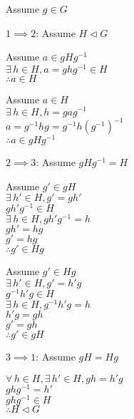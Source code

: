 \documentclass[letterpaper,12pt,fleqn]{article}
\newcommand{\n}{\mathrel{\triangleleft}}
\begin{document}
\begin{theproof}
  Assume $g\in G$
  
  \begin{description}
  \item{$1\implies2$}: Assume $H\n G$

    \begin{minipage}[t]{3in}
      Assume $a\in gHg^{-1}$ \\
      $\exists\,h\in H,a=ghg^{-1}\in H$ \\
      $\therefore a\in H$
    \end{minipage}
    \begin{minipage}[t]{3in}
      Assume $a\in H$ \\
      $\exists\,h\in H,h=gag^{-1}$ \\
      $a=g^{-1}hg=g^{-1}h(g^{-1})^{-1}$ \\
      $\therefore a\in gHg^{-1}$
    \end{minipage}

  \item{$2\implies3$}: Assume $gHg^{-1}=H$

    \begin{minipage}[t]{3in}
      Assume $g'\in gH$ \\
      $\exists\,h'\in H,g'=gh'$ \\
      $gh'g^{-1}\in H$ \\
      $\exists\,h\in H,gh'g^{-1}=h$ \\
      $gh'=hg$ \\
      $g'=hg$ \\
      $\therefore g'\in Hg$
    \end{minipage}
    \begin{minipage}[t]{3in}
      Assume $g'\in Hg$ \\
      $\exists\,h'\in H,g'=h'g$ \\
      $g^{-1}h'g\in H$ \\
      $\exists\,h\in H,g^{-1}h'g=h$ \\
      $h'g=gh$ \\
      $g'=gh$ \\
      $\therefore g'\in gH$
    \end{minipage}
\newpage
  \item{$3\implies1$}: Assume $gH=Hg$

    $\forall\,h\in H,\exists\,h'\in H,gh=h'g$ \\
    $ghg^{-1}=h'$ \\
    $ghg^{-1}\in H$ \\
    $\therefore H\n G$
  \end{description}
\end{theproof}
\end{document}
